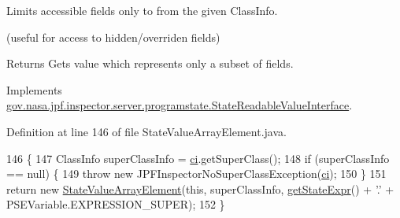 Limits accessible fields only to from the given Class\+Info. 

(useful for access to hidden/overriden fields)

\begin{DoxyReturn}{Returns}
Gets value which represents only a subset of fields. 
\end{DoxyReturn}


Implements \hyperlink{interfacegov_1_1nasa_1_1jpf_1_1inspector_1_1server_1_1programstate_1_1_state_readable_value_interface_a299f20e9db1151e4fdbe870583743799}{gov.\+nasa.\+jpf.\+inspector.\+server.\+programstate.\+State\+Readable\+Value\+Interface}.



Definition at line 146 of file State\+Value\+Array\+Element.\+java.


\begin{DoxyCode}
146                                                                             \{
147     ClassInfo superClassInfo = \hyperlink{classgov_1_1nasa_1_1jpf_1_1inspector_1_1server_1_1programstate_1_1_state_value_a0eb4aa1e630ed6372dcfb8c41ae7edc5}{ci}.getSuperClass();
148     \textcolor{keywordflow}{if} (superClassInfo == null) \{
149       \textcolor{keywordflow}{throw} \textcolor{keyword}{new} JPFInspectorNoSuperClassException(\hyperlink{classgov_1_1nasa_1_1jpf_1_1inspector_1_1server_1_1programstate_1_1_state_value_a0eb4aa1e630ed6372dcfb8c41ae7edc5}{ci});
150     \}
151     \textcolor{keywordflow}{return} \textcolor{keyword}{new} \hyperlink{classgov_1_1nasa_1_1jpf_1_1inspector_1_1server_1_1programstate_1_1_state_value_array_element_a5dd2ea7761e6a0935bc236eef5bb5c9e}{StateValueArrayElement}(\textcolor{keyword}{this}, superClassInfo, 
      \hyperlink{classgov_1_1nasa_1_1jpf_1_1inspector_1_1server_1_1programstate_1_1_state_node_a54c1c8d91f93c078171589f844252bdf}{getStateExpr}() + \textcolor{charliteral}{'.'} + PSEVariable.EXPRESSION\_SUPER);
152   \}
\end{DoxyCode}
